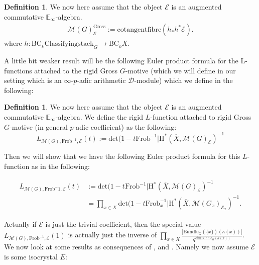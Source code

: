 \documentclass[11pt]{book}
\theoremstyle{definition}
\newtheorem{definition}[theorem]{Definition}
\numberwithin{equation}{section}
\begin{document}
\begin{definition}
We now here assume that the object $\mathcal{E}$ is an augmented commutative $\mathbb{E}_\infty$-algebra.
\begin{align}
\mathcal{M}(G)^\mathrm{Gross}_\mathcal{E}:= \mathrm{cotangentfibre}(h_*h^*\mathcal{E}).	
\end{align}
where $h: \mathrm{BC}_{\overline{k}}\mathrm{Classifyingstack}_G \rightarrow \mathrm{BC}_{\overline{k}} X$.
\end{definition}


 A little bit weaker result will be the following Euler product formula for the L-functions attached to the rigid Gross $G$-motive (which we will define in our setting which is an $\infty$-$p$-adic arithmetic $\mathcal{D}$-module) which we define in the following:


\begin{definition}
We now here assume that the object $\mathcal{E}$ is an augmented commutative $\mathbb{E}_\infty$-algebra. We define the rigid $L$-function attached to rigid Gross $G$-motive (in general $p$-adic coefficient) as the following:
\begin{displaymath}
L_{\mathcal{M}(G),\mathrm{Frob}^{-1},\mathcal{E}}(t):=\mathrm{det}(1-t\mathrm{Frob}^{-1}|\mathrm{H}^*(\overline{X},\mathcal{M}(G)_\mathcal{E})^{-1}
\end{displaymath}
\end{definition}


Then we will show that we have the following Euler product formula for this $L$-function as in the following:

\begin{align}
L_{\mathcal{M}(G),\mathrm{Frob}^-1,\mathcal{E}}(t)&:=\mathrm{det}(1-t\mathrm{Frob}^{-1}|\mathrm{H}^*(\overline{X},\mathcal{M}(G)_\mathcal{E})^{-1}\\
&=\prod_{x\in X}\mathrm{det}(1-t\mathrm{Frob}_x^{-1}|\mathrm{H}^*(\overline{X},\mathcal{M}(G_x)_{\mathcal{E}_x})^{-1}.
\end{align}

\indent Actually if $\mathcal{E}$ is just the trivial coefficient, then the special value $L_{\mathcal{M}(G),\mathrm{Frob}^{-1},\mathcal{E}}(1)$ is actually just the inverse of $\prod_{x\in X}\frac{|\mathrm{Bundle}_G(\{x\})(\kappa(x))|}{q^{\mathrm{dim}\mathrm{Bundle}_G(\kappa(x))}}$.\\



\indent We now look at some results as consequences of \cite{De1}, \cite{Ked11} and \cite{Ked12}. Namely we now assume $\mathcal{E}$ is some isocrystal $E$:
\end{document}
